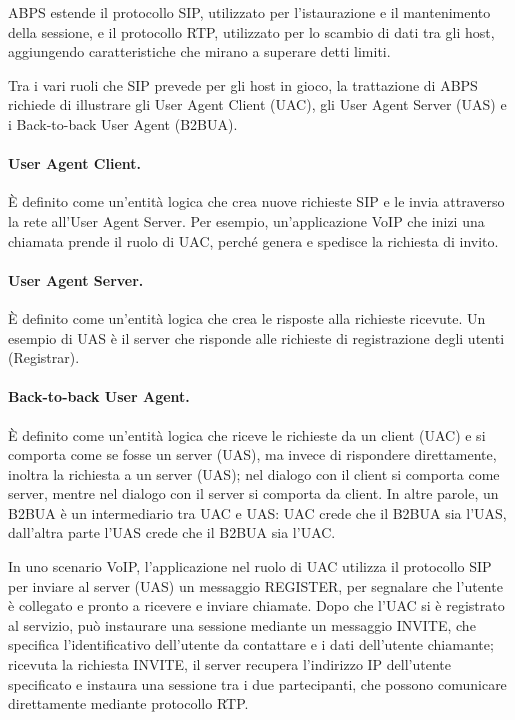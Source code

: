 \documentclass[12pt,a4paper,openright,twoside]{book}
\begin{document}
ABPS estende il protocollo SIP, utilizzato per l'istaurazione e il
mantenimento della sessione, e il protocollo RTP, utilizzato per lo
scambio di dati tra gli host, aggiungendo caratteristiche che mirano a
superare detti limiti.

Tra i vari ruoli che SIP prevede per gli host in gioco, la trattazione
di ABPS richiede di illustrare gli User Agent Client (UAC), gli User
Agent Server (UAS) e i Back-to-back User Agent (B2BUA).

\paragraph{User Agent Client.}
È definito come un'entità logica che crea nuove richieste SIP e le
invia attraverso la rete all'User Agent Server. Per esempio,
un'applicazione VoIP che inizi una chiamata prende il ruolo di UAC,
perché genera e spedisce la richiesta di invito.

\paragraph{User Agent Server.}
È definito come un'entità logica che crea le risposte alla richieste
ricevute. Un esempio di UAS è il server che risponde alle richieste di
registrazione degli utenti (Registrar).

\paragraph{Back-to-back User Agent.}
È definito come un'entità logica che riceve le richieste da un client
(UAC) e si comporta come se fosse un server (UAS), ma invece di
rispondere direttamente, inoltra la richiesta a un server (UAS); nel
dialogo con il client si comporta come server, mentre nel dialogo con
il server si comporta da client. In altre parole, un B2BUA è un
intermediario tra UAC e UAS: UAC crede che il B2BUA sia l'UAS,
dall'altra parte l'UAS crede che il B2BUA sia l'UAC.

In uno scenario VoIP, l'applicazione nel ruolo di UAC utilizza il
protocollo SIP per inviare al server (UAS) un messaggio REGISTER, per
segnalare che l'utente è collegato e pronto a ricevere e inviare
chiamate. Dopo che l'UAC si è registrato al servizio, può instaurare
una sessione mediante un messaggio INVITE, che specifica
l'identificativo dell'utente da contattare e i dati dell'utente
chiamante; ricevuta la richiesta INVITE, il server recupera
l'indirizzo IP dell'utente specificato e instaura una sessione tra i
due partecipanti, che possono comunicare direttamente mediante
protocollo RTP.
\end{document}

